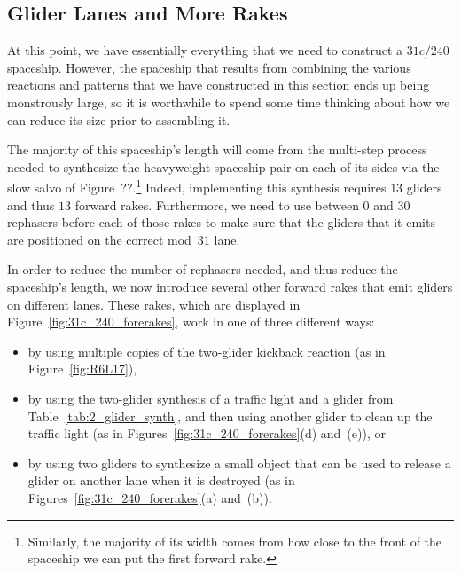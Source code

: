 


\subsection{Glider Lanes and More Rakes}\label{sec:silverfish_more_rakes}

At this point, we have essentially everything that we need to construct a $31c/240$ spaceship. However, the spaceship that results from combining the various reactions and patterns that we have constructed in this section ends up being monstrously large, so it is worthwhile to spend some time thinking about how we can reduce its size prior to assembling it.

The majority of this spaceship's length will come from the multi-step process needed to synthesize the heavyweight spaceship pair on each of its sides via the slow salvo of Figure~??.\footnote{Similarly, the majority of its width comes from how close to the front of the spaceship we can put the first forward rake.} Indeed, implementing this synthesis requires $13$ gliders and thus $13$ forward rakes. Furthermore, we need to use between $0$ and $30$ rephasers before each of those rakes to make sure that the gliders that it emits are positioned on the correct mod~$31$ lane.

In order to reduce the number of rephasers needed, and thus reduce the spaceship's length, we now introduce several other forward rakes that emit gliders on different lanes. These rakes, which are displayed in Figure~\ref{fig:31c_240_forerakes}, work in one of three different ways:\smallskip

\begin{itemize}
	\item by using multiple copies of the two-glider kickback reaction (as in Figure~\ref{fig:R6L17}),\smallskip
	
	\item by using the two-glider synthesis of a traffic light and a glider from Table~\ref{tab:2_glider_synth}, and then using another glider to clean up the traffic light (as in Figures~\ref{fig:31c_240_forerakes}(d) and~(e)), or\smallskip
	
	\item by using two gliders to synthesize a small object that can be used to release a glider on another lane when it is destroyed (as in Figures~\ref{fig:31c_240_forerakes}(a) and~(b)).\smallskip
\end{itemize}

